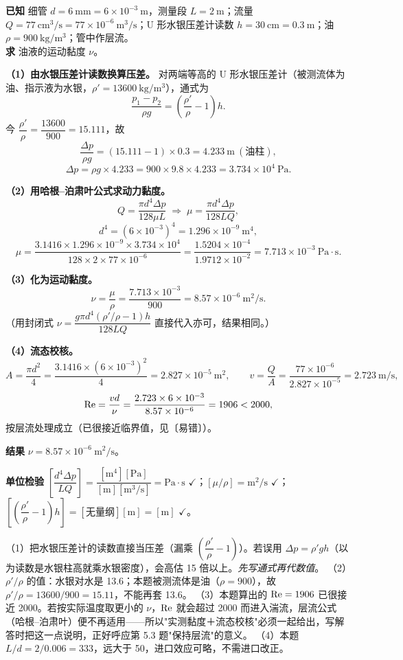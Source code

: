 \begin{jie}
\textbf{已知} 细管 $d=6\ \mathrm{mm}=6\times10^{-3}\ \mathrm{m}$，测量段 $L=2\ \mathrm{m}$；流量 $Q=77\ \mathrm{cm^3/s}=77\times10^{-6}\ \mathrm{m^3/s}$；U 形水银压差计读数 $h=30\ \mathrm{cm}=0.3\ \mathrm{m}$；油 $\rho=900\ \mathrm{kg/m^3}$；管中作层流。\\
\textbf{求} 油液的运动黏度 $\nu$。

\textbf{（1）由水银压差计读数换算压差。} 对两端等高的 U 形水银压差计（被测流体为油、指示液为水银，$\rho'=13600\ \mathrm{kg/m^3}$），通式为
\[\frac{p_1-p_2}{\rho g}=\left(\frac{\rho'}{\rho}-1\right)h.\]
今 $\dfrac{\rho'}{\rho}=\dfrac{13600}{900}=15.111$，故
\[\frac{\Delta p}{\rho g}=(15.111-1)\times0.3=4.233\ \mathrm{m}\ (\text{油柱}),\]
\[\Delta p=\rho g\times4.233=900\times9.8\times4.233=3.734\times10^4\ \mathrm{Pa}.\]

\textbf{（2）用哈根--泊肃叶公式求动力黏度。}
\[Q=\frac{\pi d^4\Delta p}{128\mu L}\;\Longrightarrow\;\mu=\frac{\pi d^4\Delta p}{128LQ},\]
\[d^4=(6\times10^{-3})^4=1.296\times10^{-9}\ \mathrm{m^4},\]
\[\mu=\frac{3.1416\times1.296\times10^{-9}\times3.734\times10^4}{128\times2\times77\times10^{-6}}
=\frac{1.5204\times10^{-4}}{1.9712\times10^{-2}}=7.713\times10^{-3}\ \mathrm{Pa\cdot s}.\]

\textbf{（3）化为运动黏度。}
\[\nu=\frac{\mu}{\rho}=\frac{7.713\times10^{-3}}{900}=8.57\times10^{-6}\ \mathrm{m^2/s}.\]
（用封闭式 $\nu=\dfrac{g\pi d^4(\rho'/\rho-1)h}{128LQ}$ 直接代入亦可，结果相同。）

\textbf{（4）流态校核。}
\[A=\frac{\pi d^2}{4}=\frac{3.1416\times(6\times10^{-3})^2}{4}=2.827\times10^{-5}\ \mathrm{m^2},\qquad
v=\frac{Q}{A}=\frac{77\times10^{-6}}{2.827\times10^{-5}}=2.723\ \mathrm{m/s},\]
\[\mathrm{Re}=\frac{vd}{\nu}=\frac{2.723\times6\times10^{-3}}{8.57\times10^{-6}}=1906<2000,\]
按层流处理成立（已很接近临界值，见〔易错〕）。

\textbf{结果} $\boxed{\nu=8.57\times10^{-6}\ \mathrm{m^2/s}}$。

\textbf{单位检验} $\left[\dfrac{d^4\Delta p}{LQ}\right]=\dfrac{[\mathrm{m^4}][\mathrm{Pa}]}{[\mathrm{m}][\mathrm{m^3/s}]}=\mathrm{Pa\cdot s}$ $\checkmark$；$[\mu/\rho]=\mathrm{m^2/s}$ $\checkmark$；
$\left[\left(\dfrac{\rho'}{\rho}-1\right)h\right]=[\text{无量纲}][\mathrm{m}]=[\mathrm{m}]$ $\checkmark$。
\end{jie}
\begin{yicuo}
（1）把水银压差计的读数直接当压差（漏乘 $\left(\dfrac{\rho'}{\rho}-1\right)$）。若误用 $\Delta p=\rho' gh$（以为读数是水银柱高就乘水银密度），会高估 15 倍以上。\emph{先写通式再代数值}。
（2）$\rho'/\rho$ 的值：水银对水是 13.6；本题被测流体是油（$\rho=900$），故 $\rho'/\rho=13600/900=15.11$，不能再套 13.6。
（3）本题算出的 $\mathrm{Re}=1906$ 已很接近 2000。若按实际温度取更小的 $\nu$，$\mathrm{Re}$ 就会超过 2000 而进入湍流，层流公式（哈根--泊肃叶）便不再适用——所以"实测黏度＋流态校核"必须一起给出，写解答时把这一点说明，正好呼应第 5.3 题"保持层流"的意义。
（4）本题 $L/d=2/0.006=333$，远大于 50，进口效应可略，不需进口改正。
\end{yicuo}
